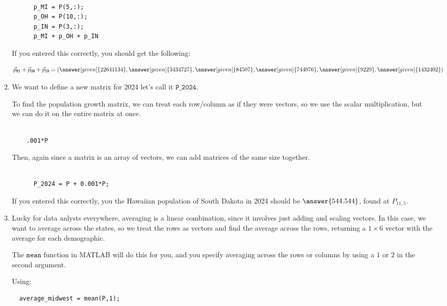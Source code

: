 \documentclass{ximera}
\begin{document}
\begin{example}
\begin{solution}
\begin{enumerate}
      \begin{verbatim}
      
      p_MI = P(5,:);
      p_OH = P(10,:);
      p_IN = P(3,:);
      p_MI + p_OH + p_IN

      \end{verbatim}

      If you entered this correctly, you should get the following:

    \[
    \vec{p}_{\texttt{MI}} + \vec{p}_{\texttt{OH}} + \vec{p}_{\texttt{IN}} = (\answer[given]{22641134},\answer[given]{3434727},\answer[given]{84507},\answer[given]{744076},\answer[given]{9229},\answer[given]{1432402})
    \]
  \item We want to define a new matrix for 2024 let's call it $\texttt{P\_2024}$.
  
  To find the population growth matrix, we can treat each row/column as if they were vectors, so we use the scalar multiplication, but we can do it on the entire matrix at once. 

  \begin{verbatim}
  
    .001*P

  \end{verbatim}

  Then, again since a matrix is an array of vectors, we can add matrices of the same size together.

    \begin{verbatim}

      P_2024 = P + 0.001*P;

    \end{verbatim}

    If you entered this correctly, you the Hawaiian population of South Dakota in 2024 should be $\answer{544.544}$, found at $P_{11,5}$.

\item Lucky for data anlysts everywhere, averaging is a linear combination, since it involves just adding and scaling vectors. In this case, we want to average across the states, so we treat the rows as vectors and find the average across the rows, returning a $1\times 6$ vector with the average for each demographic. 

The $\texttt{mean}$ function in MATLAB will do this for you, and you specify averaging across the rows or columns by using a $1$ or $2$ in the second argument. 

Using: 

\begin{verbatim}
  average_midwest = mean(P,1);
\end{verbatim}


\end{enumerate}
\end{solution}
\end{example}
\end{document}
